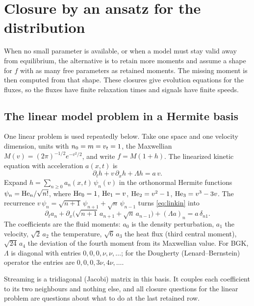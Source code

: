 \section{Closure by an ansatz for the distribution}
\label{sec:moment}

When no small parameter is available, or when a model must stay valid away
from equilibrium, the alternative is to retain more moments and assume a
shape for $f$ with as many free parameters as retained moments. The missing
moment is then computed from that shape. These closures give evolution
equations for the fluxes, so the fluxes have finite relaxation times and
signals have finite speeds.

\subsection{The linear model problem in a Hermite basis}
\label{sec:hermite}

One linear problem is used repeatedly below. Take one space and one
velocity dimension, units with $n_0=m=v_t=1$, the Maxwellian
$M(v)=(2\pi)^{-1/2}e^{-v^2/2}$, and write $f=M(1+h)$. The linearized
kinetic equation with acceleration $a(x,t)$ is
\begin{equation}
  \partial_th+v\,\partial_xh+\Lambda h=a\,v .
  \label{eq:linkin}
\end{equation}
Expand $h=\sum_{n\ge0}a_n(x,t)\,\psi_n(v)$ in the orthonormal Hermite
functions $\psi_n=\mathrm{He}_n/\sqrt{n!}$, where $\mathrm{He}_0=1$, $\mathrm{He}_1=v$,
$\mathrm{He}_2=v^2-1$, $\mathrm{He}_3=v^3-3v$. The recurrence
$v\,\psi_n=\sqrt{n+1}\,\psi_{n+1}+\sqrt n\,\psi_{n-1}$ turns
\eqref{eq:linkin} into
\begin{equation}
  \partial_ta_n+\partial_x\bigl(\sqrt{n+1}\,a_{n+1}+\sqrt n\,a_{n-1}\bigr)
  +(\Lambda a)_n=a\,\delta_{n1} .
  \label{eq:hermitehier}
\end{equation}
The coefficients are the fluid moments: $a_0$ is the density perturbation,
$a_1$ the velocity, $\sqrt2\,a_2$ the temperature, $\sqrt6\,a_3$ the heat
flux (third central moment), $\sqrt{24}\,a_4$ the deviation of the fourth
moment from its Maxwellian value. For BGK, $\Lambda$ is diagonal with
entries $0,0,0,\nu,\nu,\dots$; for the Dougherty (Lenard--Bernstein)
operator \cite{LenardBernstein58,Dougherty64} the entries are
$0,0,0,3\nu,4\nu,\dots$.

Streaming is a tridiagonal (Jacobi) matrix in this basis. It couples each
coefficient to its two neighbours and nothing else, and all closure
questions for the linear problem are questions about what to do at the last
retained row.

